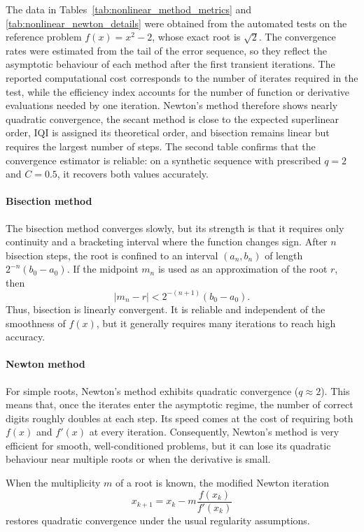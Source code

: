 The data in Tables~\ref{tab:nonlinear_method_metrics} and
\ref{tab:nonlinear_newton_details} were obtained from the automated tests on the
reference problem $f(x)=x^2-2$, whose exact root is $\sqrt{2}$. The convergence
rates were estimated from the tail of the error sequence, so they reflect the
asymptotic behaviour of each method after the first transient iterations. The
reported computational cost corresponds to the number of iterates required in
the test, while the efficiency index accounts for the number of function or
derivative evaluations needed by one iteration. Newton's method therefore shows
nearly quadratic convergence, the secant method is close to the expected
superlinear order, IQI is assigned its theoretical order, and bisection remains
linear but requires the largest number of steps. The second table confirms that
the convergence estimator is reliable: on a synthetic sequence with prescribed
$q=2$ and $C=0.5$, it recovers both values accurately.

\paragraph{Bisection method}
The bisection method converges slowly, but its strength is that it requires only
continuity and a bracketing interval where the function changes sign. After
$n$ bisection steps, the root is confined to an interval $(a_n,b_n)$ of length
$2^{-n}(b_0-a_0)$. If the midpoint $m_n$ is used as an approximation of the
root $r$, then
\begin{equation*}
	|m_n-r| < 2^{-(n+1)}(b_0-a_0).
\end{equation*}
Thus, bisection is linearly convergent. It is reliable and independent of the
smoothness of $f(x)$, but it generally requires many iterations to reach high
accuracy.

\paragraph{Newton method}
For simple roots, Newton's method exhibits quadratic convergence
($q \approx 2$). This means that, once the iterates enter the asymptotic regime,
the number of correct digits roughly doubles at each step. Its speed comes at
the cost of requiring both $f(x)$ and $f'(x)$ at every iteration. Consequently,
Newton's method is very efficient for smooth, well-conditioned problems, but it
can lose its quadratic behaviour near multiple roots or when the derivative is
small.

When the multiplicity $m$ of a root is known, the modified Newton iteration
\begin{equation*}
	x_{k+1} = x_k - m \frac{f(x_k)}{f'(x_k)}
\end{equation*}
restores quadratic convergence under the usual regularity assumptions.

